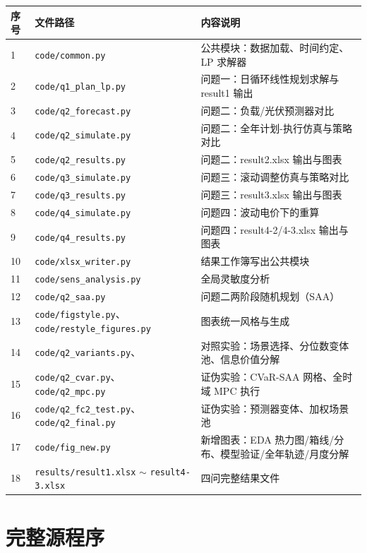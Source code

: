 \documentclass[zihao=-4,a4paper,UTF8,fontset=none]{ctexart}
\begin{document}
\begin{longtable}{@{}p{}p{}p{}@{}}
  \toprule
  序号 & 文件路径 & 内容说明 \\
  \midrule
  1 & \texttt{code/common.py} & 公共模块：数据加载、时间约定、LP 求解器 \\
  2 & \texttt{code/q1\_plan\_lp.py} & 问题一：日循环线性规划求解与 result1 输出 \\
  3 & \texttt{code/q2\_forecast.py} & 问题二：负载/光伏预测器对比 \\
  4 & \texttt{code/q2\_simulate.py} & 问题二：全年计划-执行仿真与策略对比 \\
  5 & \texttt{code/q2\_results.py} & 问题二：result2.xlsx 输出与图表 \\
  6 & \texttt{code/q3\_simulate.py} & 问题三：滚动调整仿真与策略对比 \\
  7 & \texttt{code/q3\_results.py} & 问题三：result3.xlsx 输出与图表 \\
  8 & \texttt{code/q4\_simulate.py} & 问题四：波动电价下的重算 \\
  9 & \texttt{code/q4\_results.py} & 问题四：result4-2/4-3.xlsx 输出与图表 \\
  10 & \texttt{code/xlsx\_writer.py} & 结果工作簿写出公共模块 \\
  11 & \texttt{code/sens\_analysis.py} & 全局灵敏度分析 \\
  12 & \texttt{code/q2\_saa.py} & 问题二两阶段随机规划（SAA） \\
  13 & \texttt{code/figstyle.py}、\texttt{code/restyle\_figures.py} & 图表统一风格与生成 \\
  14 & \texttt{code/q2\_variants.py}、\texttt{} & 对照实验：场景选择、分位数变体池、信息价值分解 \\
  15 & \texttt{code/q2\_cvar.py}、\texttt{code/q2\_mpc.py} & 证伪实验：CVaR-SAA 网格、全时域 MPC 执行 \\
  16 & \texttt{code/q2\_fc2\_test.py}、\texttt{code/q2\_final.py} & 证伪实验：预测器变体、加权场景池 \\
  17 & \texttt{code/fig\_new.py} & 新增图表：EDA 热力图/箱线/分布、模型验证/全年轨迹/月度分解 \\
  18 & \texttt{results/result1.xlsx} $\sim$ \texttt{result4-3.xlsx} & 四问完整结果文件 \\
  \bottomrule
\end{longtable}

\section{完整源程序}
\end{document}
